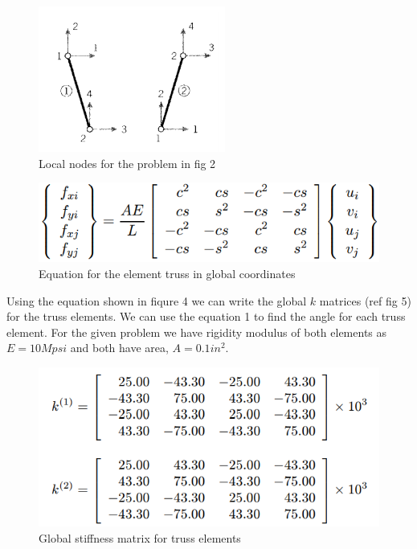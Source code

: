 \documentclass{article}
\begin{document}
\begin{figure}[h!]
\centering
\includegraphics[scale=.7]{2.png}
\caption{Local nodes for the problem in fig 2}
\label{fig:fig2}
\end{figure}

\begin{figure}[h!]
\centering
\includegraphics[scale=.5]{5.png}
\caption{Equation for the element truss in global coordinates}
\label{fig:fig2}
\end{figure}

Using the equation shown in fiqure 4 we can write the global $k$ matrices (ref fig 5) for the truss elements. We can use the equation 1 to find the angle for each truss element. For the given problem we have rigidity  modulus of both elements as $E = 10 Mpsi$ and both have area, $A = 0.1 in^2$.

\begin{figure}[h!]
\centering
\includegraphics[scale=.6]{6.png}
\caption{Global stiffness matrix for truss elements}
\label{fig:fig1}
\end{figure}
\end{document}
